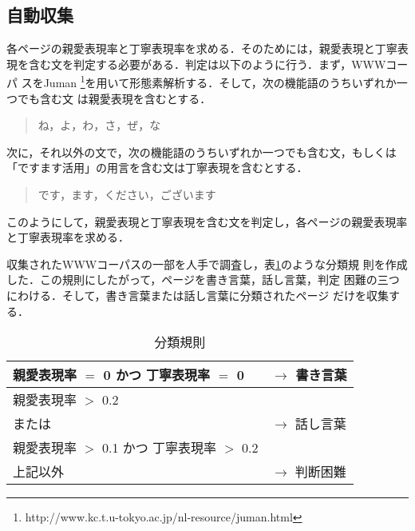 \documentclass{nlp}
\begin{document}
\subsection{自動収集}
各ページの親愛表現率と丁寧表現率を求める．そのためには，親愛表現と丁寧表
現を含む文を判定する必要がある．判定は以下のように行う．まず，WWWコーパ
スをJuman
\footnote{
http://www.kc.t.u-tokyo.ac.jp/nl-resource/juman.html
}を用いて形態素解析する．そして，次の機能語のうちいずれか一つでも含む文
は親愛表現を含むとする．
\begin{quote}
 ね，よ，わ，さ，ぜ，な
\end{quote}
次に，それ以外の文で，次の機能語のうちいずれか一つでも含む文，もしくは
「ですます活用」の用言を含む文は丁寧表現を含むとする．
\begin{quote}
 です，ます，ください，ございます
\end{quote}
このようにして，親愛表現と丁寧表現を含む文を判定し，各ページの親愛表現率
と丁寧表現率を求める．

収集されたWWWコーパスの一部を人手で調査し，表\ref{collect}のような分類規
則を作成した．この規則にしたがって，ページを書き言葉，話し言葉，判定
困難の三つにわける．そして，書き言葉または話し言葉に分類されたページ
だけを収集する．
\begin{table}[h]
 \begin{center}
  \caption{分類規則}
  \label{collect}
  \begin{tabular}{ll}\hline
   親愛表現率 $=$ 0 かつ 丁寧表現率 $=$ 0     & $\rightarrow$ 書き言葉 \\ \hline
   親愛表現率 $>$ 0.2                         &                          \\
   または                                     & $\rightarrow$ 話し言葉 \\
   親愛表現率 $>$ 0.1 かつ 丁寧表現率 $>$ 0.2 &                          \\ \hline
   上記以外                                   & $\rightarrow$ 判断困難   \\ \hline
  \end{tabular}
 \end{center}
\end{table}
\end{document}
